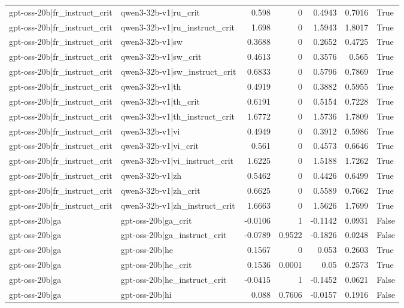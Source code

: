 \begin{table}
\begin{tabular}{l l r r r r l}
gpt-oss-20b|fr_instruct_crit & qwen3-32b-v1|ru_crit & 0.598 & 0 & 0.4943 & 0.7016 & True \\
gpt-oss-20b|fr_instruct_crit & qwen3-32b-v1|ru_instruct_crit & 1.698 & 0 & 1.5943 & 1.8017 & True \\
gpt-oss-20b|fr_instruct_crit & qwen3-32b-v1|sw & 0.3688 & 0 & 0.2652 & 0.4725 & True \\
gpt-oss-20b|fr_instruct_crit & qwen3-32b-v1|sw_crit & 0.4613 & 0 & 0.3576 & 0.565 & True \\
gpt-oss-20b|fr_instruct_crit & qwen3-32b-v1|sw_instruct_crit & 0.6833 & 0 & 0.5796 & 0.7869 & True \\
gpt-oss-20b|fr_instruct_crit & qwen3-32b-v1|th & 0.4919 & 0 & 0.3882 & 0.5955 & True \\
gpt-oss-20b|fr_instruct_crit & qwen3-32b-v1|th_crit & 0.6191 & 0 & 0.5154 & 0.7228 & True \\
gpt-oss-20b|fr_instruct_crit & qwen3-32b-v1|th_instruct_crit & 1.6772 & 0 & 1.5736 & 1.7809 & True \\
gpt-oss-20b|fr_instruct_crit & qwen3-32b-v1|vi & 0.4949 & 0 & 0.3912 & 0.5986 & True \\
gpt-oss-20b|fr_instruct_crit & qwen3-32b-v1|vi_crit & 0.561 & 0 & 0.4573 & 0.6646 & True \\
gpt-oss-20b|fr_instruct_crit & qwen3-32b-v1|vi_instruct_crit & 1.6225 & 0 & 1.5188 & 1.7262 & True \\
gpt-oss-20b|fr_instruct_crit & qwen3-32b-v1|zh & 0.5462 & 0 & 0.4426 & 0.6499 & True \\
gpt-oss-20b|fr_instruct_crit & qwen3-32b-v1|zh_crit & 0.6625 & 0 & 0.5589 & 0.7662 & True \\
gpt-oss-20b|fr_instruct_crit & qwen3-32b-v1|zh_instruct_crit & 1.6663 & 0 & 1.5626 & 1.7699 & True \\
gpt-oss-20b|ga & gpt-oss-20b|ga_crit & -0.0106 & 1 & -0.1142 & 0.0931 & False \\
gpt-oss-20b|ga & gpt-oss-20b|ga_instruct_crit & -0.0789 & 0.9522 & -0.1826 & 0.0248 & False \\
gpt-oss-20b|ga & gpt-oss-20b|he & 0.1567 & 0 & 0.053 & 0.2603 & True \\
gpt-oss-20b|ga & gpt-oss-20b|he_crit & 0.1536 & 0.0001 & 0.05 & 0.2573 & True \\
gpt-oss-20b|ga & gpt-oss-20b|he_instruct_crit & -0.0415 & 1 & -0.1452 & 0.0621 & False \\
gpt-oss-20b|ga & gpt-oss-20b|hi & 0.088 & 0.7606 & -0.0157 & 0.1916 & False \\

\end{tabular}
\end{table}
